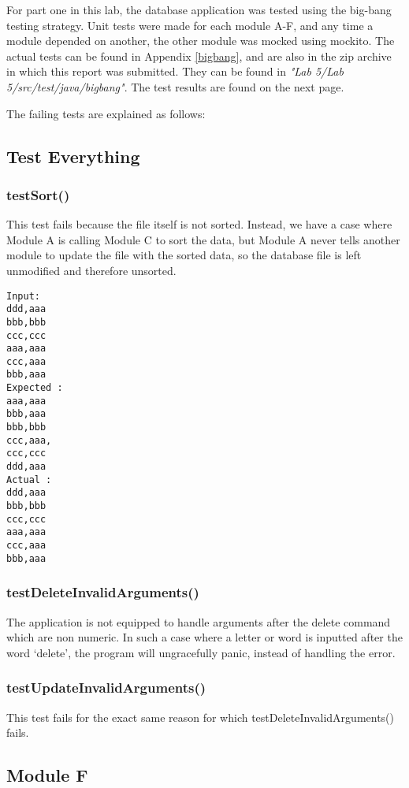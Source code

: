 For part one in this lab, the database application was tested using the big-bang
testing strategy. Unit tests were made for each module A-F, and any time a
module depended on another, the other module was mocked using mockito. The
actual tests can be found in Appendix \ref{bigbang}, and are also in the zip
archive in which this report was submitted. They can be found in
\emph{"Lab 5/Lab 5/src/test/java/bigbang"}. The test results are found on the
next page.


The failing tests are explained as follows:
\subsection{Test Everything}
\subsubsection{testSort()}
This test fails because the file itself is not sorted. Instead, we have a case
where Module A is calling Module C to sort the data, but Module A never tells
another module to update the file with the sorted data, so the database file is
left unmodified and therefore unsorted.

\begin{verbatim}
Input:
ddd,aaa
bbb,bbb
ccc,ccc
aaa,aaa
ccc,aaa
bbb,aaa
Expected :
aaa,aaa
bbb,aaa
bbb,bbb
ccc,aaa,
ccc,ccc
ddd,aaa
Actual :
ddd,aaa
bbb,bbb
ccc,ccc
aaa,aaa
ccc,aaa
bbb,aaa
\end{verbatim}


\subsubsection{testDeleteInvalidArguments()}
The application is not equipped to handle arguments after the delete command
which are non numeric. In such a case where a letter or word is inputted after
the word `delete', the program will ungracefully panic, instead of handling the
error.

\subsubsection{testUpdateInvalidArguments()}
This test fails for the exact same reason for which
testDeleteInvalidArguments() fails.

\subsection{Module F}

